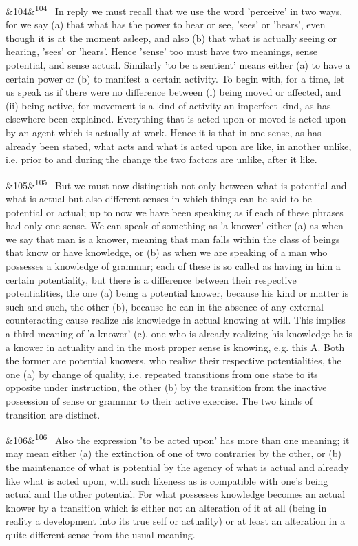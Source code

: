 \documentclass[12pt]{article}
\newcommand{\para}[1][]{\par\noindent\ifx&#1&\else\textsuperscript{\footnotesize #1}~\fi}
\begin{document}
\para[104] In reply we must recall that we use the word 'perceive' in two ways, for we say (a) that what has the power to hear or see, 'sees' or 'hears', even though it is at the moment asleep, and also (b) that what is actually seeing or hearing, 'sees' or 'hears'. Hence 'sense' too must have two meanings, sense potential, and sense actual. Similarly 'to be a sentient' means either (a) to have a certain power or (b) to manifest a certain activity. To begin with, for a time, let us speak as if there were no difference between (i) being moved or affected, and (ii) being active, for movement is a kind of activity-an imperfect kind, as has elsewhere been explained. Everything that is acted upon or moved is acted upon by an agent which is actually at work. Hence it is that in one sense, as has already been stated, what acts and what is acted upon are like, in another unlike, i.e. prior to and during the change the two factors are unlike, after it like.

\para[105] But we must now distinguish not only between what is potential and what is actual but also different senses in which things can be said to be potential or actual; up to now we have been speaking as if each of these phrases had only one sense. We can speak of something as 'a knower' either (a) as when we say that man is a knower, meaning that man falls within the class of beings that know or have knowledge, or (b) as when we are speaking of a man who possesses a knowledge of grammar; each of these is so called as having in him a certain potentiality, but there is a difference between their respective potentialities, the one (a) being a potential knower, because his kind or matter is such and such, the other (b), because he can in the absence of any external counteracting cause realize his knowledge in actual knowing at will. This implies a third meaning of 'a knower' (c), one who is already realizing his knowledge-he is a knower in actuality and in the most proper sense is knowing, e.g. this A. Both the former are potential knowers, who realize their respective potentialities, the one (a) by change of quality, i.e. repeated transitions from one state to its opposite under instruction, the other (b) by the transition from the inactive possession of sense or grammar to their active exercise. The two kinds of transition are distinct.

\para[106] Also the expression 'to be acted upon' has more than one meaning; it may mean either (a) the extinction of one of two contraries by the other, or (b) the maintenance of what is potential by the agency of what is actual and already like what is acted upon, with such likeness as is compatible with one's being actual and the other potential. For what possesses knowledge becomes an actual knower by a transition which is either not an alteration of it at all (being in reality a development into its true self or actuality) or at least an alteration in a quite different sense from the usual meaning.
\end{document}
